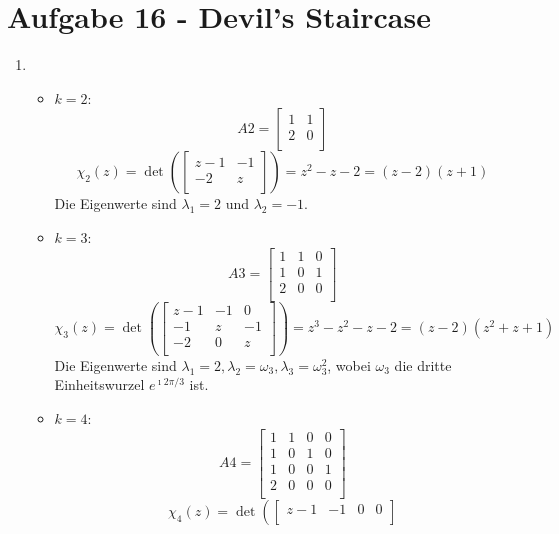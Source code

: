 \section*{Aufgabe 16 - Devil's Staircase}
\begin{enumerate}
\item
	\begin{itemize}
		\item $k= 2$: 
			\[ A2 = \begin{bmatrix}
					1 & 1 \\
					2 & 0 \\
				\end{bmatrix} \]
			\[ \chi_2(z) = \det \left( 
				\begin{bmatrix}
					z - 1 & -1 \\
					-2    & z  \\
				\end{bmatrix} \right) =
				z^2 - z - 2 = (z-2)(z+1) \]
			Die Eigenwerte sind $\lambda_1 = 2$ und $\lambda_2 = -1$.
		\item $k = 3$:
			\[ A3 = \begin{bmatrix}
					1 & 1 & 0 \\
					1 & 0 & 1 \\
					2 & 0 & 0 \\
				\end{bmatrix} \]
			\[ \chi_3(z) = \det \left(
				\begin{bmatrix}
					z-1 & -1 & 0 \\
					-1 & z & -1 \\
					-2 & 0 & z \\
				\end{bmatrix} \right) =
				z^3 - z^2 - z - 2 = (z-2)(z^2 + z + 1) \]
			Die Eigenwerte sind $\lambda_1 = 2, \lambda_2 = \omega_3, \lambda_3 = \omega_3^2 $,
			wobei $\omega_3$ die dritte Einheitswurzel $e^{\imath 2 \pi / 3}$ ist.
		\item $k = 4$:
			\[ A4 =	\begin{bmatrix}
					1 & 1 & 0 & 0 \\
					1 & 0 & 1 & 0 \\
					1 & 0 & 0 & 1 \\
					2 & 0 & 0 & 0 \\
				\end{bmatrix} \]
			\[ \chi_4(z) = \det \left(
				\begin{bmatrix}
					z-1 & -1 & 0 & 0 \\

\end{bmatrix}\]
\end{itemize}
\end{enumerate}
